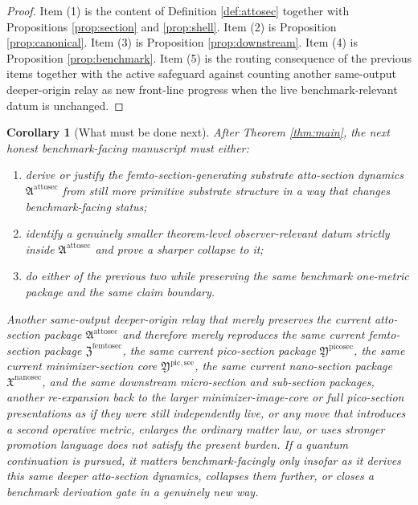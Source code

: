 \documentclass[11pt]{article}
\newcommand{\NanoSectionPackage}{\mathfrak X^{\mathrm{nanosec}}}
\newcommand{\PicoSectionPackage}{\mathfrak Y^{\mathrm{picosec}}}
\newcommand{\PicoMinSectionCore}{\mathfrak Y^{\mathrm{pic,sec}}}
\newcommand{\FemtoSectionPackage}{\mathfrak Z^{\mathrm{femtosec}}}
\newcommand{\AttoSectionPackage}{\mathfrak A^{\mathrm{attosec}}}
\newtheorem{corollary}{Corollary}
\begin{document}
\begin{proof}
Item (1) is the content of Definition \ref{def:attosec} together with Propositions \ref{prop:section} and \ref{prop:shell}. Item (2) is Proposition \ref{prop:canonical}. Item (3) is Proposition \ref{prop:downstream}. Item (4) is Proposition \ref{prop:benchmark}. Item (5) is the routing consequence of the previous items together with the active safeguard against counting another same-output deeper-origin relay as new front-line progress when the live benchmark-relevant datum is unchanged.
\end{proof}

\begin{corollary}[What must be done next]
\label{cor:next}
After Theorem \ref{thm:main}, the next honest benchmark-facing manuscript must either:
\begin{enumerate}
    \item derive or justify the femto-section-generating substrate atto-section dynamics \(\AttoSectionPackage\) from still more primitive substrate structure in a way that changes benchmark-facing status;
    \item identify a genuinely smaller theorem-level observer-relevant datum strictly inside \(\AttoSectionPackage\) and prove a sharper collapse to it;
    \item do either of the previous two while preserving the same benchmark one-metric package and the same claim boundary.
\end{enumerate}
Another same-output deeper-origin relay that merely preserves the current atto-section package \(\AttoSectionPackage\) and therefore merely reproduces the same current femto-section package \(\FemtoSectionPackage\), the same current pico-section package \(\PicoSectionPackage\), the same current minimizer-section core \(\PicoMinSectionCore\), the same current nano-section package \(\NanoSectionPackage\), and the same downstream micro-section and sub-section packages, another re-expansion back to the larger minimizer-image-core or full pico-section presentations as if they were still independently live, or any move that introduces a second operative metric, enlarges the ordinary matter law, or uses stronger promotion language does not satisfy the present burden. If a quantum continuation is pursued, it matters benchmark-facingly only insofar as it derives this same deeper atto-section dynamics, collapses them further, or closes a benchmark derivation gate in a genuinely new way.
\end{corollary}
\end{document}
